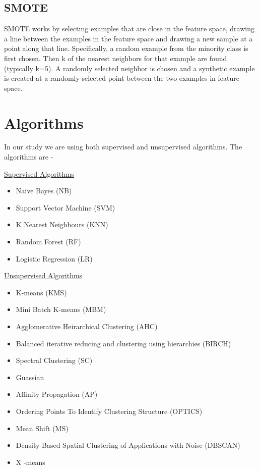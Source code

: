 \subsection{SMOTE}
SMOTE works by selecting examples that are close in the feature space, drawing a line between the examples in the feature space and drawing a new sample at a point along that line.
Specifically, a random example from the minority class is first chosen. Then k of the nearest neighbors for that example are found (typically k=5). A randomly selected neighbor is chosen and a synthetic example is created at a randomly selected point between the two examples in feature space.

\section{Algorithms}
In our study we are using both supervised and unsupervised algorithms. The algorithms are - \newline

    \underline{Supervised Algorithms}
    \begin{itemize}
        \item Naive Bayes (NB)
        \item Support Vector Machine (SVM)
        \item K Nearest Neighbours (KNN)
        \item Random Forest (RF)
        \item Logistic Regression (LR)
        \newline
    \end{itemize}
    
    \underline{Unsupervised Algorithms}
    \begin{itemize}
        \item K-means (KMS)
        \item Mini Batch K-means (MBM)
        \item Agglomerative Heirarchical Clustering (AHC)
        \item Balanced iterative reducing and clustering using hierarchies (BIRCH)
        \item Spectral Clustering (SC)
        \item Guassian
        \item Affinity Propagation (AP)
        \item Ordering Points To Identify Clustering Structure (OPTICS)
        \item Mean Shift (MS)
        \item Density-Based Spatial Clustering of Applications with Noise (DBSCAN)
        \item X -means
        \newline
    \end{itemize}

